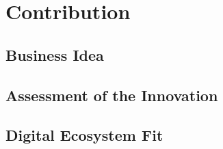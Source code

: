 \section{Contribution}
\label{sec:contribution}

\subsection{Business Idea}

\subsection{Assessment of the Innovation}

\subsection{Digital Ecosystem Fit}
